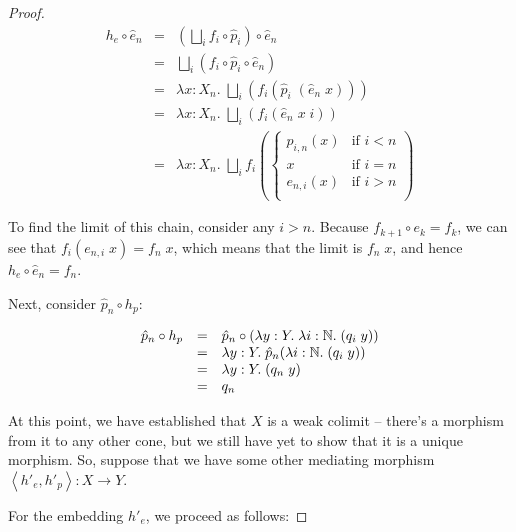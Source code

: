 \begin{proof}
\begin{displaymath}
\begin{array}{lcl}
   h_e \circ \hat{e}_n 
   & = & 
     (\bigsqcup_i f_i \circ \hat{p}_i) \circ \hat{e}_n 
\\
   & = & 
     \bigsqcup_i (f_i \circ \hat{p}_i \circ \hat{e}_n)
\\
   & = & 
     \lambda x:X_n.\; \bigsqcup_i (f_i (\hat{p}_i \; (\hat{e}_n\;x)))
\\
   & = & 
     \lambda x:X_n.\; \bigsqcup_i (f_i (\hat{e}_n\;x\;i))
\\
   & = & 
     \lambda x:X_n.\; \bigsqcup_i f_i 
       \left(\left\{ 
          \begin{array}{ll}
            p_{i,n}(x) & \mbox{if } i < n \\
            x         & \mbox{if } i = n \\
            e_{n,i}(x) & \mbox{if } i > n \\
          \end{array}
       \right.\right)
\end{array}
\end{displaymath}

To find the limit of this chain, consider any $i > n$. Because $f_{k+1} \circ e_k = f_k$, 
we can see that $f_i(e_{n,i}\;x) = f_n\;x$, which means that the limit is $f_n\;x$, and
hence $h_e \circ \hat{e}_n = f_n$. 

Next, consider $\hat{p}_n \circ h_p$: 

\begin{displaymath}
\begin{array}{lcl}
   \hat{p}_n \circ h_p
   & = & 
     \hat{p}_n \circ (\lambda y:Y.\;\lambda i:\mathbb{N}.\;(q_i\;y))
\\
   & = & 
     \lambda y:Y.\; \hat{p}_n (\lambda i:\mathbb{N}.\;(q_i\;y))
\\
   & = & 
     \lambda y:Y.\; (q_n\;y)
\\
   & = & 
     q_n 
\\
\end{array}
\end{displaymath}

At this point, we have established that $X$ is a weak colimit --
there's a morphism from it to any other cone, but we still have yet to
show that it is a unique morphism. So, suppose that we have some 
other mediating morphism $\left<h'_e, h'_p\right> : X \to Y$. 

For the embedding $h'_e$, we proceed as follows:


\end{proof}
